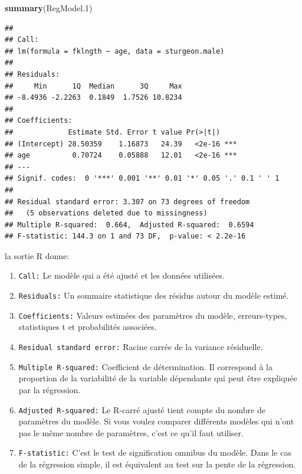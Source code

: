 \documentclass[12pt,]{book}
\newenvironment{Shaded}{\begin{snugshade}}{\end{snugshade}}
\newcommand{\FloatTok}[1]{\textcolor[rgb]{0.06,0.06,0.06}{#1}}
\newcommand{\KeywordTok}[1]{\textcolor[rgb]{0.27,0.27,0.27}{\textbf{#1}}}
\newcommand{\NormalTok}[1]{#1}
\providecommand{\tightlist}{%
  \setlength{\itemsep}{0pt}\setlength{\parskip}{0pt}}
\begin{document}
\begin{Shaded}
\begin{Highlighting}[]
\KeywordTok{summary}\NormalTok{(RegModel}\FloatTok{.1}\NormalTok{)}
\end{Highlighting}
\end{Shaded}

\begin{verbatim}
## 
## Call:
## lm(formula = fklngth ~ age, data = sturgeon.male)
## 
## Residuals:
##     Min      1Q  Median      3Q     Max 
## -8.4936 -2.2263  0.1849  1.7526 10.8234 
## 
## Coefficients:
##             Estimate Std. Error t value Pr(>|t|)    
## (Intercept) 28.50359    1.16873   24.39   <2e-16 ***
## age          0.70724    0.05888   12.01   <2e-16 ***
## ---
## Signif. codes:  0 '***' 0.001 '**' 0.01 '*' 0.05 '.' 0.1 ' ' 1
## 
## Residual standard error: 3.307 on 73 degrees of freedom
##   (5 observations deleted due to missingness)
## Multiple R-squared:  0.664,	Adjusted R-squared:  0.6594 
## F-statistic: 144.3 on 1 and 73 DF,  p-value: < 2.2e-16
\end{verbatim}

la sortie R donne:

\begin{enumerate}
\def\labelenumi{\arabic{enumi}.}
\tightlist
\item
  \texttt{Call:} Le modèle qui a été ajusté et les données utilisées.
\item
  \texttt{Residuals:} Un sommaire statistique des résidus autour du modèle estimé.
\item
  \texttt{Coefficients:} Valeurs estimées des paramètres du modèle, erreurs-types, statistiques t et probabilités associées.
\item
  \texttt{Residual\ standard\ error:} Racine carrée de la variance résiduelle.
\item
  \texttt{Multiple\ R-squared:} Coefficient de détermination. Il correspond à la proportion de la variabilité de la variable dépendante qui peut être expliquée par la régression.
\item
  \texttt{Adjusted\ R-squared:} Le R-carré ajusté tient compte du nombre de paramètres du modèle. Si vous voulez comparer différents modèles qui n'ont pas le même nombre de paramètres, c'est ce qu'il faut utiliser.
\item
  \texttt{F-statistic:} C'est le test de signification omnibus du modèle. Dans le cas de la régression simple, il est équivalent au test sur la pente de la régression.
\end{enumerate}
\end{document}
